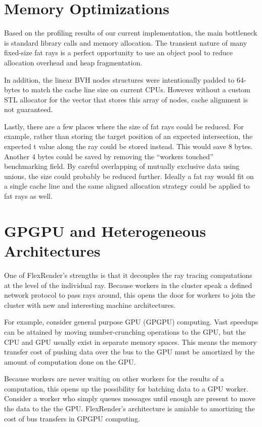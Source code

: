 \documentclass[12pt]{ucthesis}
\begin{document}
\section{Memory Optimizations}
\label{memory}

Based on the profiling results of our current implementation, the main
bottleneck is standard library calls and memory allocation. The transient
nature of many fixed-size fat rays is a perfect opportunity to use an object
pool to reduce allocation overhead and heap fragmentation.

In addition, the linear BVH nodes structures were intentionally padded to
64-bytes to match the cache line size on current CPUs. However without a custom
STL allocator for the vector that stores this array of nodes, cache alignment
is not guaranteed.

Lastly, there are a few places where the size of fat rays could be reduced.
For example, rather than storing the target position of an expected
intersection, the expected t value along the ray could be stored instead. This
would save 8 bytes. Another 4 bytes could be saved by removing the ``workers
touched'' benchmarking field. By careful overlapping of mutually exclusive data
using unions, the size could probably be reduced further. Ideally a fat ray
would fit on a single cache line and the same aligned allocation strategy could
be applied to fat rays as well.

\section{GPGPU and Heterogeneous Architectures}
\label{hetergenous}

One of FlexRender's strengths is that it decouples the ray tracing computations
at the level of the individual ray. Because workers in the cluster speak a
defined network protocol to pass rays around, this opens the door for workers to
join the cluster with new and interesting machine architectures.

For example, consider general purpose GPU (GPGPU) computing. Vast speedups can
be attained by moving number-crunching operations to the GPU, but the CPU and
GPU usually exist in separate memory spaces. This means the memory transfer cost
of pushing data over the bus to the GPU must be amortized by the amount of
computation done on the GPU.

Because workers are never waiting on other workers for the results of a
computation, this opens up the possibility for batching data to a GPU worker.
Consider a worker who simply queues messages until enough are present to move
the data to the the GPU. FlexRender's architecture is amiable to amortizing
the cost of bus transfers in GPGPU computing.
\end{document}
